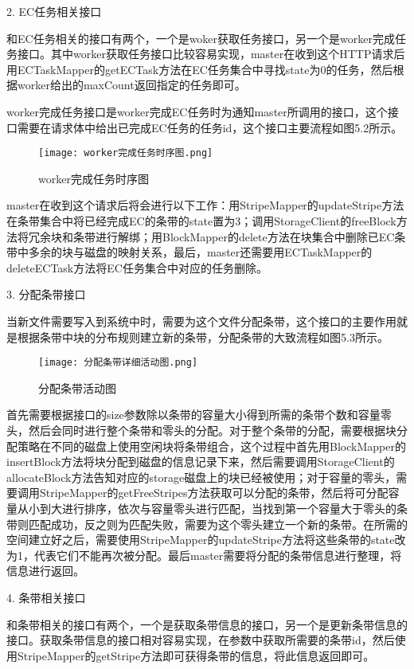 2. EC任务相关接口

和EC任务相关的接口有两个，一个是woker获取任务接口，另一个是worker完成任务接口。其中worker获取任务接口比较容易实现，master在收到这个HTTP请求后用ECTaskMapper的getECTask方法在EC任务集合中寻找state为0的任务，然后根据worker给出的maxCount返回指定的任务即可。

worker完成任务接口是worker完成EC任务时为通知master所调用的接口，这个接口需要在请求体中给出已完成EC任务的任务id，这个接口主要流程如图5.2所示。

\begin{figure}[h]
  \centering
  \texttt{[image: worker完成任务时序图.png]}
  \caption{worker完成任务时序图}
\end{figure}

master在收到这个请求后将会进行以下工作：用StripeMapper的updateStripe方法在条带集合中将已经完成EC的条带的state置为3；调用StorageClient的freeBlock方法将冗余块和条带进行解绑；用BlockMapper的delete方法在块集合中删除已EC条带中多余的块与磁盘的映射关系，最后，master还需要用ECTaskMapper的deleteECTask方法将EC任务集合中对应的任务删除。

3. 分配条带接口

当新文件需要写入到系统中时，需要为这个文件分配条带，这个接口的主要作用就是根据条带中块的分布规则建立新的条带，分配条带的大致流程如图5.3所示。

\begin{figure}[h]
  \centering
  \texttt{[image: 分配条带详细活动图.png]}
  \caption{分配条带活动图}
\end{figure}

首先需要根据接口的size参数除以条带的容量大小得到所需的条带个数和容量零头，然后会同时进行整个条带和零头的分配。对于整个条带的分配，需要根据块分配策略在不同的磁盘上使用空闲块将条带组合，这个过程中首先用BlockMapper的insertBlock方法将块分配到磁盘的信息记录下来，然后需要调用StorageClient的allocateBlock方法告知对应的storage磁盘上的块已经被使用；对于容量的零头，需要调用StripeMapper的getFreeStripes方法获取可以分配的条带，然后将可分配容量从小到大进行排序，依次与容量零头进行匹配，当找到第一个容量大于零头的条带则匹配成功，反之则为匹配失败，需要为这个零头建立一个新的条带。在所需的空间建立好之后，需要使用StripeMapper的updateStripe方法将这些条带的state改为1，代表它们不能再次被分配。最后master需要将分配的条带信息进行整理，将信息进行返回。

4. 条带相关接口

和条带相关的接口有两个，一个是获取条带信息的接口，另一个是更新条带信息的接口。获取条带信息的接口相对容易实现，在参数中获取所需要的条带id，然后使用StripeMapper的getStripe方法即可获得条带的信息，将此信息返回即可。

